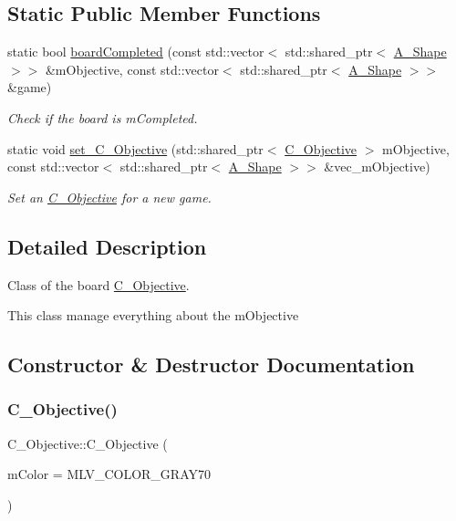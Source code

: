 \subsection*{Static Public Member Functions}
\begin{DoxyCompactItemize}
\item 
static bool \hyperlink{classObjective_aba5fe938ebccb3825d6b03cd789d6d61}{board\+Completed} (const std\+::vector$<$ std\+::shared\+\_\+ptr$<$ \hyperlink{classShape}{A_Shape} $>$$>$ \&mObjective, const std\+::vector$<$ std\+::shared\+\_\+ptr$<$ \hyperlink{classShape}{A_Shape} $>$$>$ \&game)
\begin{DoxyCompactList}\small\item\em Check if the board is mCompleted. \end{DoxyCompactList}\item
static void \hyperlink{classObjective_adecebbf5e11f3e778b1b7f48735a0765}{set\+\_\+\+C_Objective} (std\+::shared\+\_\+ptr$<$ \hyperlink{classObjective}{C_Objective} $>$ mObjective, const std\+::vector$<$ std\+::shared\+\_\+ptr$<$ \hyperlink{classShape}{A_Shape} $>$$>$ \&vec\+\_\+mObjective)
\begin{DoxyCompactList}\small\item\em Set an \hyperlink{classObjective}{C_Objective} for a new game. \end{DoxyCompactList}\end{DoxyCompactItemize}


\subsection{Detailed Description}
Class of the board \hyperlink{classObjective}{C_Objective}.

This class manage everything about the mObjective

\subsection{Constructor \& Destructor Documentation}
\mbox{\label{classObjective_ae515d38979a806a95f9476f4437311ab}} 
\subsubsection{\texorpdfstring{C_Objective()}{C_Objective()}\hspace{0.1cm}{\footnotesize\ttfamily [1/2]}}
{\footnotesize\ttfamily C_Objective\+::\+C_Objective (\begin{DoxyParamCaption}\item[{M\+L\+V\+\_\+\+Color}]{mColor = {\ttfamily MLV\+\_\+COLOR\+\_\+GRAY70} }\end{DoxyParamCaption})\hspace{0.3cm}{\ttfamily [explicit]}}



